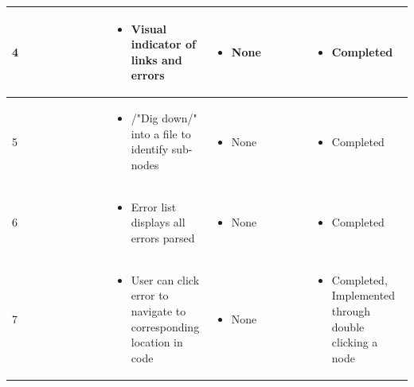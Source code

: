 \documentclass[letterpaper,10pt,titlepage,draftclsnofoot,onecolumn,onesided] {IEEEtran}
\begin{document}
{\begin{center}
\begin{singlespace}
\begin{tabular}{ |  p{0.25\linewidth}  |  p{0.25\linewidth}  | p{0.25\linewidth} | p{0.25\linewidth} |}
        \\ \hline

            4
		& 
			\begin{itemize}
				\item Visual indicator of links and errors
			\end{itemize}
		& 
			\begin{itemize}
				\item None
			\end{itemize}
		&
			\begin{itemize}
				\item Completed
			\end{itemize} 
		
        \\ \hline

        	5
		& 
			\begin{itemize}
				\item /"Dig down/" into a file to identify sub-nodes
			\end{itemize}
		& 
			\begin{itemize}
				\item None
			\end{itemize}
		&
			\begin{itemize}
				\item Completed
			\end{itemize} 
		
        \\ \hline

        	6
		& 
			\begin{itemize}
				\item Error list displays all errors parsed
			\end{itemize}
		& 
			\begin{itemize}
				\item None
			\end{itemize}
		&
			\begin{itemize}
				\item Completed
			\end{itemize} 
		
        \\ \hline

        	7
		& 
			\begin{itemize}
				\item User can click error to navigate to corresponding location in code
			\end{itemize}
		& 
			\begin{itemize}
				\item None
			\end{itemize}
		&
			\begin{itemize}
				\item Completed, Implemented through double clicking a node
			\end{itemize} 
		

\end{tabular}
\end{singlespace}
\end{center}}
\end{document}
